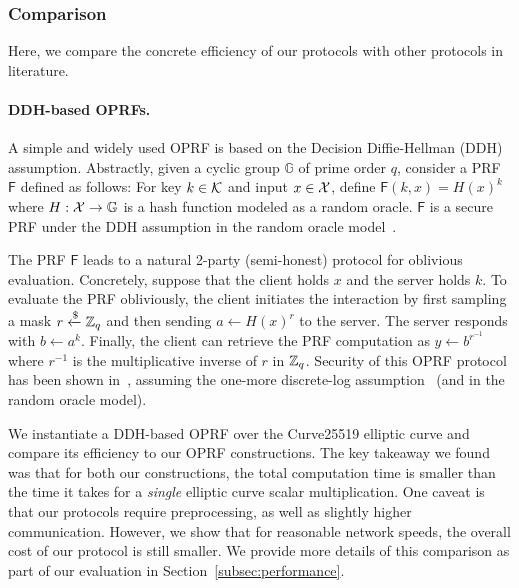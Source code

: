 \iffull
\subsubsection{Comparison}
\label{subsec:oprf-comparison}
Here, we compare the concrete efficiency of our protocols with other protocols in literature.
\paragraph{DDH-based OPRFs.}
A simple and widely used OPRF is based on the Decision Diffie-Hellman (DDH) assumption. Abstractly, given a cyclic group $\mathbb{G}$ of prime order $q$, consider a PRF $\mathsf{F}$ defined as follows: For key $k \in \mathcal{K}$ and input $x \in \mathcal{X}$, define $\mathsf{F}(k,x) = H(x)^k$ where $H:\mathcal{X} \to \mathbb{G}$ is a hash function modeled as a random oracle. $\mathsf{F}$ is a secure PRF under the DDH assumption in the random oracle model~\cite{naor1999-oprf}.

The PRF $\mathsf{F}$ leads to a natural 2-party (semi-honest) protocol for oblivious evaluation. Concretely, suppose that the client holds $x$ and the server holds $k$. To evaluate the PRF obliviously, the client initiates the interaction by first sampling a mask $r \xleftarrow{\$} \mathbb{Z}_q$ and then sending $a \gets H(x)^r$ to the server. The server responds with $b \gets a^k$. Finally, the client can retrieve the PRF computation as $y \gets b^{r^{-1}}$ where $r^{-1}$ is the multiplicative inverse of $r$ in $\mathbb{Z}_q$. Security of this OPRF protocol has been shown in~\cite{jarecki2014-ddhoprf,jarecki2016-ddhoprf}, assuming the one-more discrete-log assumption~\cite{bellare2003-onemore} (and in the random oracle model).

We instantiate a DDH-based OPRF over the Curve25519 elliptic curve and compare its efficiency to our OPRF constructions. The key takeaway we found was that for both our constructions, the total computation time is smaller than the time it takes for a \textit{single} elliptic curve scalar multiplication. One caveat is that our protocols require preprocessing, as well as slightly higher communication. However, we show that for reasonable network speeds, the overall cost of our protocol is still smaller. We provide more details of this comparison as part of our evaluation in Section~\ref{subsec:performance}.


